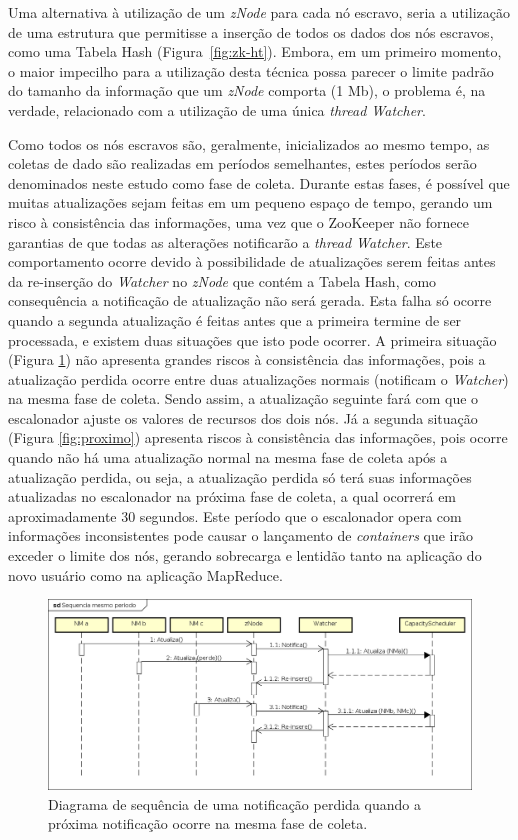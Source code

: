 Uma alternativa à utilização de um \textit{zNode} para cada nó escravo, seria a utilização de uma estrutura que permitisse a inserção de todos os dados dos nós escravos, como uma Tabela Hash (Figura~\ref{fig:zk-ht}). Embora, em um primeiro momento, o maior impecilho para a utilização desta técnica possa parecer o limite padrão do tamanho da informação que um \textit{zNode} comporta (1 Mb), o problema é, na verdade, relacionado com a utilização de uma única \textit{thread Watcher}. 

Como todos os nós escravos são, geralmente, inicializados ao mesmo tempo, as coletas de dado são realizadas em períodos semelhantes, estes períodos serão denominados neste estudo como fase de coleta. Durante estas fases, é possível que muitas atualizações sejam feitas em um pequeno espaço de tempo, gerando um risco à consistência das informações, uma vez que o ZooKeeper não fornece garantias de que todas as alterações notificarão a \textit{thread Watcher}. Este comportamento ocorre devido à possibilidade de atualizações serem feitas antes da re-inserção do \textit{Watcher} no \textit{zNode} que contém a Tabela Hash, como consequência a notificação de atualização não será gerada. Esta falha só ocorre quando a segunda atualização é feitas antes que a primeira termine de ser processada, e existem duas situações que isto pode ocorrer. A primeira situação (Figura \ref{fig:mesmo}) não apresenta grandes riscos à consistência das informações, pois a atualização perdida  ocorre entre duas atualizações normais (notificam o \textit{Watcher}) na mesma fase de coleta. Sendo assim, a atualização seguinte fará com que o escalonador ajuste os valores de recursos dos dois nós. Já a segunda situação (Figura \ref{fig:proximo}) apresenta riscos à consistência das informações, pois ocorre quando não há uma atualização normal na mesma fase de coleta após a atualização perdida, ou seja, a atualização perdida só terá suas informações atualizadas no escalonador na próxima fase de coleta, a qual ocorrerá em aproximadamente 30 segundos. Este período que o escalonador opera com informações inconsistentes pode causar o lançamento de \textit{containers} que irão exceder o limite dos nós, gerando sobrecarga e lentidão tanto na aplicação do novo usuário como na aplicação MapReduce.


\begin{figure}[!hbt]
   \centering
   \includegraphics[width=\textwidth]{figuras/seq-sam-per.png}
   \caption{Diagrama de sequência de uma notificação perdida quando a próxima notificação ocorre na mesma fase de coleta.}
   \label{fig:mesmo}
\end{figure}


